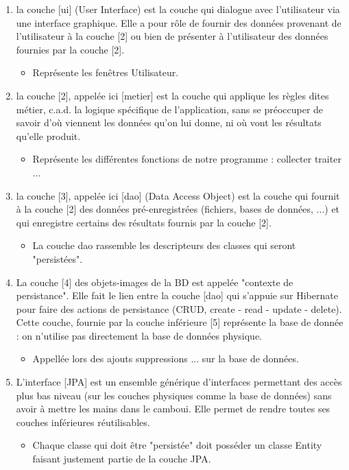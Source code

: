 \begin{enumerate}
\item la couche [ui] (User Interface) est la couche qui dialogue avec l'utilisateur via une interface graphique. Elle a pour rôle de fournir des données provenant de l'utilisateur à la couche [2] ou bien de présenter à l'utilisateur des données fournies par la couche [2].
\begin{itemize}
\item Représente les fenêtres Utilisateur.
\end{itemize}

\item la couche [2], appelée ici [metier] est la couche qui applique les règles dites métier, c.a.d. la logique spécifique de l'application, sans se préoccuper de savoir d'où viennent les données qu'on lui donne, ni où vont les résultats qu'elle produit.
\begin{itemize}
\item Représente les différentes fonctions de notre programme : collecter traiter ...
\end{itemize}

\item la couche [3], appelée ici [dao] (Data Access Object) est la couche qui fournit à la couche [2] des données pré-enregistrées (fichiers, bases de données, ...) et qui enregistre certains des résultats fournis par la couche [2].
\begin{itemize}
\item La couche dao rassemble les descripteurs des classes qui seront "persistées".
\end{itemize}

\item La couche [4] des objets-images de la BD est appelée "contexte de persistance". Elle fait le lien entre la couche [dao] qui s'appuie sur Hibernate pour faire des actions de persistance (CRUD, create - read - update - delete).  Cette couche, fournie par la couche inférieure [5] représente la base de donnée : on n'utilise pas directement la base de données physique.
\begin{itemize}
\item Appellée lors des ajouts suppressions ... sur la base de données.
\end{itemize}

\item L'interface [JPA] est un ensemble générique d'interfaces permettant des accès plus bas niveau (sur les couches physiques comme la base de données) sans avoir à mettre les mains dans le camboui. Elle permet de rendre toutes ses couches inférieures réutilisables.
\begin{itemize}
\item Chaque classe qui doit être "persistée" doit posséder un classe Entity faisant justement partie de la couche JPA.
\end{itemize}


\end{enumerate}
